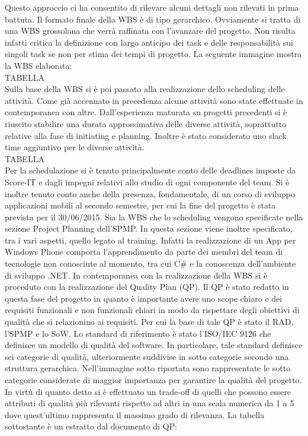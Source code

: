 Questo approccio ci ha consentito di rilevare alcuni dettagli non rilevati in prima battuta. 
Il formato finale della WBS è di tipo gerarchico. Ovviamente si tratta di una WBS grossolana che verrà raffinata con l’avanzare del progetto. Non risulta infatti critica la definizione con largo anticipo dei task e delle responsabilità sui singoli task se non per stima dei tempi di progetto.
La seguente immagine mostra la WBS elaborata:
\\
TABELLA
\\
Sulla base della WBS si è poi passato alla realizzazione dello scheduling delle attività.
Come già accennato in precedenza alcune attività sono state effettuate in contemporanea con altre. Dall’esperienza maturata su progetti precedenti si è riuscito stabilire una durata approssimativa delle diverse attività, soprattutto relative alla fase di initiating e planning.
Inoltre è stato considerato uno slack time aggiuntivo per le diverse attività.
\\
TABELLA
\\
Per la schedulazione si è tenuto principalmente conto delle deadlines imposte da Score-IT e dagli impegni relativi allo studio di ogni componente del team.
Si è inoltre tenuto conto anche della presenza, fondamentale, di un corso di sviluppo applicazioni mobili al secondo semestre, per cui la fine del progetto è stata prevista per il 30/06/2015.
Sia la WBS che lo scheduling vengono specificate nella sezione Project Planning dell’SPMP. In questa sezione viene inoltre specificato, tra i vari aspetti, quello legato al training.
Infatti la realizzazione di un App per Windows Phone comporta 
l\rq apprendimento da parte dei membri del team di tecnologie non conosciute al momento, tra cui C\# e la conoscenza dell’ambiente di sviluppo .NET.
In contemporanea con la realizzazione della WBS si è proceduto con la realizzazione del Quality Plan (QP). 
Il QP è stato redatto in questa fase del progetto in quanto è importante avere uno scope chiaro e dei requisiti funzionali e non funzionali chiari in modo da rispettare degli obiettivi di qualità che si relazionino ai requisiti.
Per cui la base di tale QP è stato il RAD, l’SPMP e lo SoW.
Lo standard di riferimento è stato l’ISO/IEC 9126 che definisce un modello di qualità del software. In particolare, tale standard definisce sei categorie di qualità, ulteriormente suddivise in sotto categorie secondo una struttura gerarchica.
Nell’immagine sotto riportata sono rappresentate le sotto categorie considerate di maggior importanza per garantire la qualità del progetto.
In virtù di quanto detto si è effettuato un trade-off di quelli che possono essere attributi di qualità più rilevanti rispetto ad altri in una scala numerica da 1 a 5 dove quest’ultimo rappresenta il massimo grado di rilevanza. La tabella sottostante è un estratto dal documento di QP:

